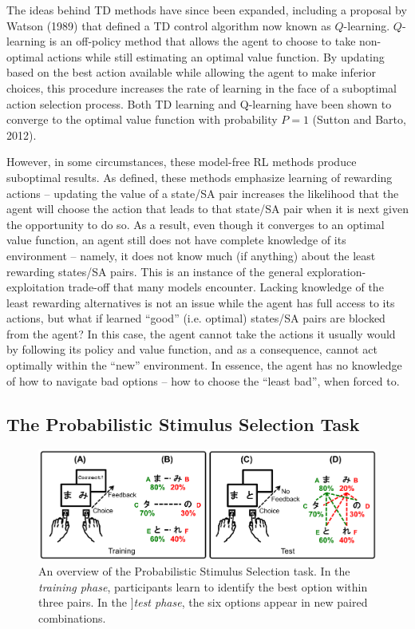\documentclass[10pt,letterpaper]{article}
\begin{document}
The ideas behind TD methods have since been expanded, including a proposal by Watson (1989) that defined a TD control algorithm now known as $Q$-learning. $Q$-learning is an off-policy method that allows the agent to choose to take non-optimal actions while still estimating an optimal value function. By updating based on the best action available while allowing the agent to make inferior choices, this procedure increases the rate of learning in the face of a suboptimal action selection process. Both TD learning and Q-learning have been shown to converge to the optimal value function with probability $P = 1$ (Sutton and Barto, 2012).

However, in some circumstances, these model-free RL methods produce suboptimal results. As defined, these methods emphasize learning of rewarding actions – updating the value of a state/SA pair increases the likelihood that the agent will choose the action that leads to that state/SA pair when it is next given the opportunity to do so. As a result, even though it converges to an optimal value function, an agent still does not have complete knowledge of its environment – namely, it does not know much (if anything) about the least rewarding states/SA pairs. This is an instance of the general exploration-exploitation trade-off that many models encounter. Lacking knowledge of the least rewarding alternatives is not an issue while the agent has full access to its actions, but what if learned ``good'' (i.e. optimal) states/SA pairs are blocked from the agent? In this case, the agent cannot take the actions it usually would by following its policy and value function, and as a consequence, cannot act optimally within the ``new'' environment. In essence, the agent has no knowledge of how to navigate bad options – how to choose the ``least bad'', when forced to.

\subsection{The Probabilistic Stimulus Selection Task}

\begin{figure}[ht]
	\begin{center}
		\includegraphics[width=6.5in]{pss.png}
	\end{center}
	\caption{An overview of the Probabilistic Stimulus Selection task. In the \emph{training phase}, participants learn to identify the best option within three pairs. In the ]\emph{test phase}, the six options appear in new paired combinations.}
	\label{pss}
\end{figure}
\end{document}
